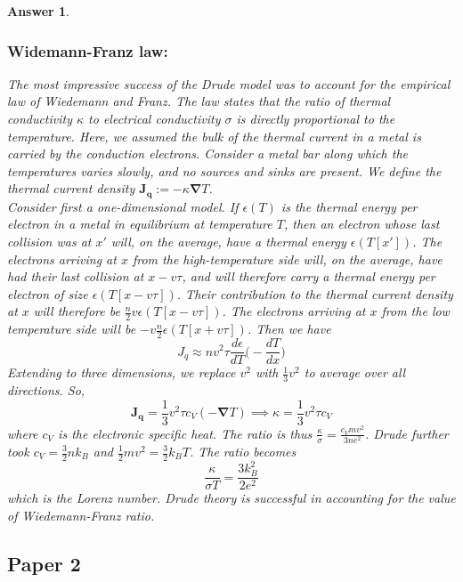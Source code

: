 \documentclass[a4paper]{article}
\newtheorem{ans}{Answer}[subsection]
\theoremstyle{new}
\begin{document}
\begin{ans}
\subsubsection*{Widemann-Franz law:}
The most impressive success of the Drude model was to account for the empirical law of Wiedemann and Franz. The law states that the ratio of thermal conductivity $\kappa$ to electrical conductivity $\sigma$ is directly proportional to the temperature. Here, we assumed the bulk of the thermal current in a metal is carried by the conduction electrons. Consider a metal bar along which the temperatures varies slowly, and no sources and sinks are present. We define the thermal current density $\mathbf{J_q}:=-\kappa\boldsymbol{\nabla}T$.\\[5pt]
Consider first a one-dimensional model. If $\epsilon(T)$ is the thermal energy per electron in a metal in equilibrium at temperature $T$, then an electron whose last collision was at $x'$ will, on the average, have a thermal energy $\epsilon(T[x'])$. The electrons arriving at $x$ from the high-temperature side will, on the average, have had their last collision at $x-v\tau$, and will therefore carry a thermal energy per electron of size $\epsilon(T[x-v\tau])$. Their contribution to the thermal current density at $x$ will therefore be $\frac{n}{2}v\epsilon(T[x-v\tau])$. The electrons arriving at $x$ from the low temperature side will be $-v\frac{n}{2}\epsilon(T[x+v\tau])$. Then we have 
$$J_q\approx nv^2\tau\frac{d\epsilon}{dT}\bigg(-\frac{dT}{dx}\bigg)$$
Extending to three dimensions, we replace $v^2$ with $\frac{1}{3}v^2$ to average over all directions. So,
$$\mathbf{J_q}=\frac{1}{3}v^2\tau c_V(-\boldsymbol{\nabla}T)\implies\kappa=\frac{1}{3}v^2\tau c_V$$
where $c_V$ is the electronic specific heat. The ratio is thus $\frac{\kappa}{\sigma}=\frac{c_Vmv^2}{3ne^2}$. Drude further took $c_V=\frac{3}{2}nk_B$ and $\frac{1}{2}mv^2=\frac{3}{2}k_BT$. The ratio becomes
$$\frac{\kappa}{\sigma T}=\frac{3k_B^2}{2e^2}$$
which is the Lorenz number. Drude theory is successful in accounting for the value of Wiedemann-Franz ratio. 
\end{ans}
\newpage
\subsection{Paper 2}
\end{document}
